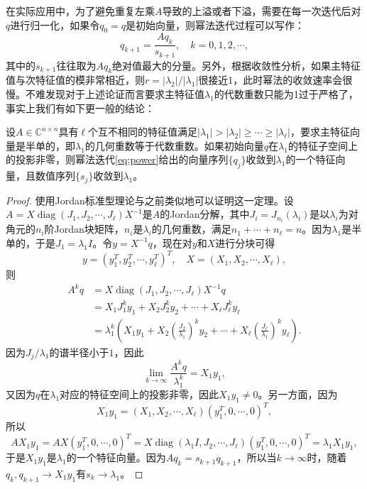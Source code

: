 \documentclass[a4paper,10pt]{ctexart}
\begin{document}
在实际应用中，为了避免重复左乘$ A $导致的上溢或者下溢，需要在每一次迭代后对$ q $进行归一化，如果令$ q_0 = q $是初始向量，则幂法迭代过程可以写作：
\begin{equation}\label{eq:power}
    q_{k+1} = \frac{Aq_k}{s_{k+1}},\quad k = 0,1,2,\cdots,
\end{equation}
其中的$ s_{k+1} $往往取为$ Aq_k $绝对值最大的分量。另外，根据收敛性分析，如果主特征值与次特征值的模非常相近，则$ r = |\lambda_2| / |\lambda_1| $很接近1，此时幂法的收敛速率会很慢。不难发现对于上述论证而言要求主特征值$ \lambda_1 $的代数重数只能为1过于严格了，事实上我们有如下更一般的结论：
\begin{theorem}
    设$ A\in \mathbb{C}^{n\times n} $具有$ \ell $个互不相同的特征值满足$ |\lambda_1|>|\lambda_2|\geqslant \cdots \geqslant |\lambda_\ell| $，要求主特征向量是半单的，即$ \lambda_1 $的几何重数等于代数重数。如果初始向量$ q $在$ \lambda_1 $的特征子空间上的投影非零，则幂法迭代\eqref{eq:power}给出的向量序列$ \{q_j\} $收敛到$ \lambda_1 $的一个特征向量，且数值序列$ \{s_j\} $收敛到$ \lambda_1 $。
\end{theorem}
\begin{proof}
    使用Jordan标准型理论与之前类似地可以证明这一定理。设$ A = X \operatorname{diag}(J_1,J_2,\cdots ,J_\ell)X^{-1} $是$ A $的Jordan分解，其中$ J_i = J_{n_i}(\lambda_i) $是以$ \lambda_i $为对角元的$ n_i $阶Jordan块矩阵，$ n_i $是$ \lambda_i $的几何重数，满足$ n_1+\cdots +n_\ell = n $。因为$ \lambda_1 $是半单的，于是$ J_1 = \lambda_1 I $。令$ y = X^{-1}q $，现在对$ y $和$ X $进行分块可得
    \[
        y = (y_1^T,y_2^T,\cdots ,y_\ell^T)^T, \quad X = (X_1,X_2,\cdots ,X_\ell),
    \]
    则
    \[
        \begin{aligned}
            A^k q 
            &= X \operatorname{diag}(J_1,J_2,\cdots ,J_\ell)X^{-1} q\\
            &= X_1 J_1^k y_1 + X_2 J_2^k y_2 + \cdots + X_\ell J_\ell^k y_\ell\\
            &= \lambda_1^k \left( X_1 y_1 + X_2 (\frac{J_2}{\lambda_1})^k y_2 + \cdots + X_\ell (\frac{J_\ell}{\lambda_1})^ky_\ell \right) .
        \end{aligned}
    \]
    因为$ J_j / \lambda_1 $的谱半径小于$ 1 $，因此
    \[
        \lim_{k\to \infty}\frac{A^k q}{\lambda_1^k} = X_1 y_1,
    \]
    又因为$ q $在$ \lambda_1 $对应的特征空间上的投影非零，因此$ X_1y_1\ne 0 $。另一方面，因为
    \[
        X_1 y_1 = (X_1, X_2, \cdots, X_\ell) (y_1^T, 0, \cdots, 0)^T,
    \]
    所以
    \[
        A X_1 y_1 = A X (y_1^T, 0, \cdots, 0)^T = X \operatorname{diag}(\lambda_1 I,J_2,\cdots ,J_\ell)(y_1^T, 0, \cdots, 0)^T = \lambda_1 X_1 y_1,
    \]
    于是$ X_1 y_1 $是$ \lambda_1 $的一个特征向量。因为$ A q_k = s_{k+1}q_{k+1} $，所以当$ k\to \infty $时，随着$ q_k,q_{k+1}\to X_1 y_1 $有$ s_k \to \lambda_1 $。
\end{proof}
\end{document}
